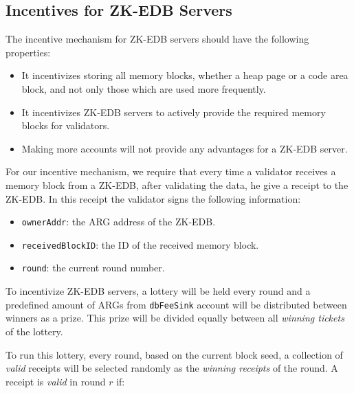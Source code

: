 
\subsection{Incentives for ZK-EDB Servers}\label{subsec:zk-edb-servers}

The incentive mechanism for ZK-EDB servers should have the following properties:

\begin{itemize}
    \item It incentivizes storing all memory blocks, whether a heap page or a code area block, and not only those
    which are used more frequently.
    \item It incentivizes ZK-EDB servers to actively provide the required memory blocks for validators.
    \item Making more accounts will not provide any advantages for a ZK-EDB server.
\end{itemize}

For our incentive mechanism, we require that every time a validator receives a memory block from a ZK-EDB, after
validating the data, he give a receipt to the ZK-EDB. In this receipt the validator signs the following information:

\begin{itemize}
    \item \texttt{ownerAddr}: the ARG address of the ZK-EDB\@.
    \item \texttt{receivedBlockID}: the ID of the received memory block.
    \item \texttt{round}: the current round number.
\end{itemize}


To incentivize ZK-EDB servers, a lottery will be held every round and a predefined amount of ARGs from
\texttt{dbFeeSink} account will be distributed between winners as a prize. This prize will be divided equally
between all \emph{winning tickets} of the lottery.


To run this lottery, every round, based on the current block seed, a collection of \emph{valid} receipts will be
selected randomly as the \emph{winning receipts} of the round. A receipt is \emph{valid} in round \(r\) if:

